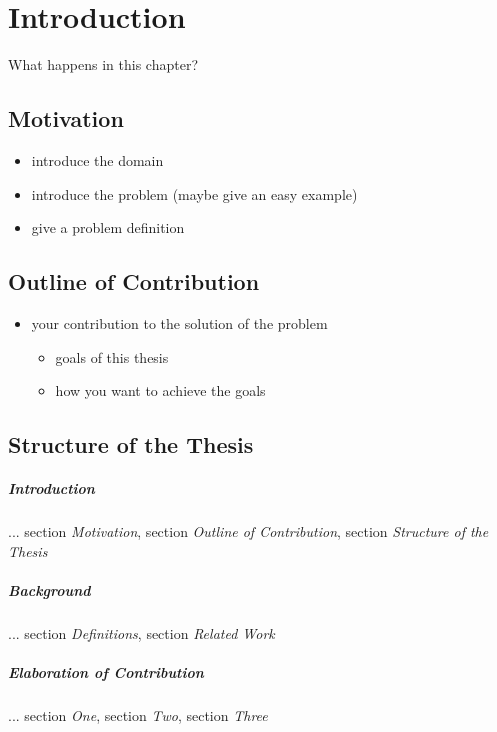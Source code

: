 \chapter{Introduction}

What happens in this chapter? 

\section{Motivation}

\begin{itemize}
\item introduce the domain
\item introduce the problem (maybe give an easy example)
\item give a problem definition
\end{itemize}

\section{Outline of Contribution}

\begin{itemize}
\item your contribution to the solution of the problem
\begin{itemize}
  \item goals of this thesis
  \item how you want to achieve the goals
\end{itemize}
\end{itemize}

\section{Structure of the Thesis}

\paragraph{Introduction} ... section \textit{Motivation}, section \textit{Outline of Contribution}, section \textit{Structure of the Thesis}

\paragraph{Background} ... section \textit{Definitions}, section \textit{Related Work}

\paragraph{Elaboration of Contribution} ... section \textit{One}, section \textit{Two}, section \textit{Three}

